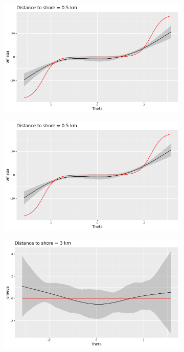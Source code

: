 \documentclass[11pt]{article}
\newcommand {\1}{\mathbb{1}}
\begin{document}
\begin{figure}[H]
	\centering
	\begin{subfigure}{0.48\textwidth}
		\centering
		\includegraphics[scale=0.3]{images/simulation study/crcvm_fjords_hf_ne1_omega_close.png}
		\caption{}
	\end{subfigure}
	\begin{subfigure}{0.48\textwidth}
		\centering
		\includegraphics[scale=0.3]{images/simulation study/crcvm_fjords_hf_ne1_omega_close.png}
		\caption{}
	\end{subfigure}
	\begin{subfigure}{0.48\textwidth}
		\centering
		\includegraphics[scale=0.3]{images/simulation study/crcvm_fjords_hf_ne1_omega_far.png}

\end{subfigure}
\end{figure}
\end{document}
